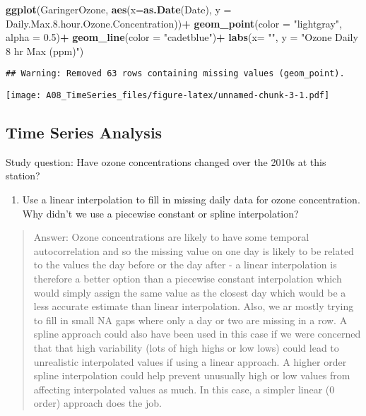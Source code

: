 \documentclass[
]{article}
\newenvironment{Shaded}{\begin{snugshade}}{\end{snugshade}}
\newcommand{\DataTypeTok}[1]{\textcolor[rgb]{0.13,0.29,0.53}{#1}}
\newcommand{\FloatTok}[1]{\textcolor[rgb]{0.00,0.00,0.81}{#1}}
\newcommand{\KeywordTok}[1]{\textcolor[rgb]{0.13,0.29,0.53}{\textbf{#1}}}
\newcommand{\NormalTok}[1]{#1}
\newcommand{\OperatorTok}[1]{\textcolor[rgb]{0.81,0.36,0.00}{\textbf{#1}}}
\newcommand{\StringTok}[1]{\textcolor[rgb]{0.31,0.60,0.02}{#1}}
\providecommand{\tightlist}{%
  \setlength{\itemsep}{0pt}\setlength{\parskip}{0pt}}
\begin{document}
\begin{Shaded}
\begin{Highlighting}[]
\KeywordTok{ggplot}\NormalTok{(GaringerOzone, }\KeywordTok{aes}\NormalTok{(}\DataTypeTok{x=}\KeywordTok{as.Date}\NormalTok{(Date), }\DataTypeTok{y =}\NormalTok{ Daily.Max.}\FloatTok{8.}\NormalTok{hour.Ozone.Concentration))}\OperatorTok{+}
\StringTok{  }\KeywordTok{geom_point}\NormalTok{(}\DataTypeTok{color =} \StringTok{"lightgray"}\NormalTok{, }\DataTypeTok{alpha =} \FloatTok{0.5}\NormalTok{)}\OperatorTok{+}
\StringTok{  }\KeywordTok{geom_line}\NormalTok{(}\DataTypeTok{color =} \StringTok{"cadetblue"}\NormalTok{)}\OperatorTok{+}
\StringTok{  }\KeywordTok{labs}\NormalTok{(}\DataTypeTok{x=} \StringTok{""}\NormalTok{, }\DataTypeTok{y =} \StringTok{"Ozone Daily 8 hr Max (ppm)"}\NormalTok{)}
\end{Highlighting}
\end{Shaded}

\begin{verbatim}
## Warning: Removed 63 rows containing missing values (geom_point).
\end{verbatim}

\texttt{[image: A08\_TimeSeries\_files/figure-latex/unnamed-chunk-3-1.pdf]}

\hypertarget{time-series-analysis}{%
\subsection{Time Series Analysis}\label{time-series-analysis}}

Study question: Have ozone concentrations changed over the 2010s at this
station?

\begin{enumerate}
\def\labelenumi{\arabic{enumi}.}
\setcounter{enumi}{7}
\tightlist
\item
  Use a linear interpolation to fill in missing daily data for ozone
  concentration. Why didn't we use a piecewise constant or spline
  interpolation?
\end{enumerate}

\begin{quote}
Answer: Ozone concentrations are likely to have some temporal
autocorrelation and so the missing value on one day is likely to be
related to the values the day before or the day after - a linear
interpolation is therefore a better option than a piecewise constant
interpolation which would simply assign the same value as the closest
day which would be a less accurate estimate than linear interpolation.
Also, we ar mostly trying to fill in small NA gaps where only a day or
two are missing in a row. A spline approach could also have been used in
this case if we were concerned that that high variability (lots of high
highs or low lows) could lead to unrealistic interpolated values if
using a linear approach. A higher order spline interpolation could help
prevent unusually high or low values from affecting interpolated values
as much. In this case, a simpler linear (0 order) approach does the job.
\end{quote}
\end{document}
